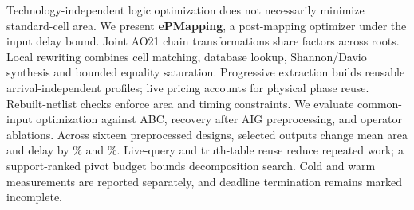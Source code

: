 Technology-independent logic optimization does not necessarily minimize standard-cell area. We present \textbf{ePMapping}, a post-mapping optimizer under the input delay bound. Joint AO21 chain transformations share factors across roots. Local rewriting combines cell matching, database lookup, Shannon/Davio synthesis and bounded equality saturation. Progressive extraction builds reusable arrival-independent profiles; live pricing accounts for physical phase reuse. Rebuilt-netlist checks enforce area and timing constraints. We evaluate common-input optimization against ABC, recovery after AIG preprocessing, and operator ablations. Across sixteen preprocessed designs, selected outputs change mean area and delay by \OwnArea\% and \OwnDelay\%. Live-query and truth-table reuse reduce repeated work; a support-ranked pivot budget bounds decomposition search. Cold and warm measurements are reported separately, and deadline termination remains marked incomplete.
